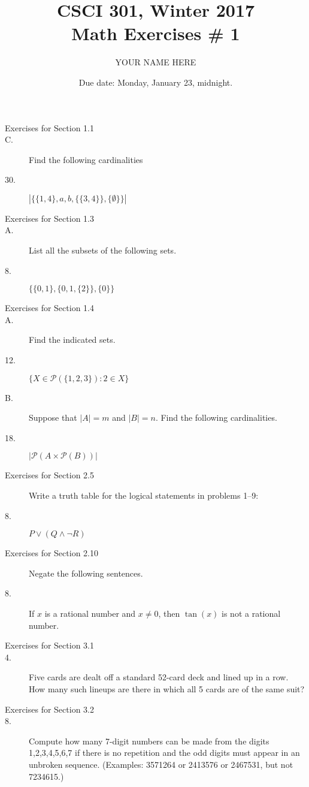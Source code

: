 \documentclass{article}
\title{CSCI 301, Winter 2017\\Math Exercises \# 1}
\author{YOUR NAME HERE}
\date{Due date:  Monday, January 23, midnight.}
\begin{document}
\maketitle

\begin{description}
\item[Exercises for Section 1.1]
\item[C.] Find the following cardinalities
\item[30.] $|\{\{1,4\},a,b,\{\{3,4\}\},\{\emptyset\}\}|$

\item[Exercises for Section 1.3]
\item[A.] List all the subsets of the following sets.
\item[8.] $\{\{0,1\},\{0,1,\{2\}\},\{0\}\}$

\item[Exercises for Section 1.4]
\item[A.] Find the indicated sets.
\item[12.] $\{X\in\mathcal{P}(\{1,2,3\}):2\in X\}$
\item[B.] Suppose that $|A|=m$ and $|B|=n$.  Find the following cardinalities.
\item[18.] $|\mathcal{P}(A\times \mathcal{P}(B))|$


\item[Exercises for Section 2.5] Write a truth table for the logical
  statements in problems 1--9:

\item[8.] $P \vee (Q \wedge \neg R)$

\item[Exercises for Section 2.10]  Negate the following sentences.


\item[8.] If $x$ is a rational number and $x\not = 0$, then
  $\tan(x)$ is not a rational number.
  

\item[Exercises for Section 3.1]

\item[4.]  Five cards are dealt off a standard 52-card deck and
  lined up in a row.  How many such lineups are there in
  which all 5 cards are of the same suit?

\item[Exercises for Section 3.2]

\item[8.] Compute how many 7-digit numbers can be made from the digits
  1,2,3,4,5,6,7 if there is no repetition and the odd digits
  must appear in an unbroken sequence.  (Examples: 3571264 or 2413576 or
  2467531, but not 7234615.)


\end{description}
\end{document}
